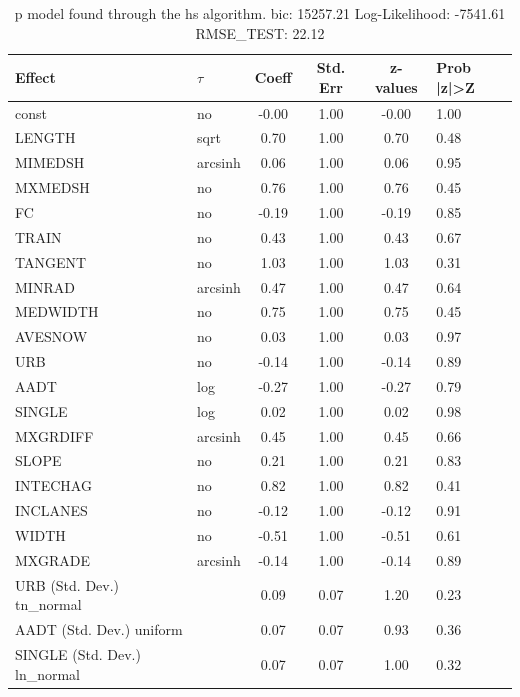 \begin{table}
	\caption{p model found through the hs algorithm. bic: 15257.21 Log-Likelihood: -7541.61 RMSE_TEST: 22.12}
	\begin{center}
		\begin{tabular}{|l|l|c|c|c|l|}
			\hline
			Effect & $\tau$ & Coeff & Std. Err & z-values & Prob |z|>Z \\
			\hline
			const & no & -0.00 & 1.00 & -0.00 & 1.00 \\
			\hline
			LENGTH & sqrt & 0.70 & 1.00 & 0.70 & 0.48 \\
			\hline
			MIMEDSH & arcsinh & 0.06 & 1.00 & 0.06 & 0.95 \\
			\hline
			MXMEDSH & no & 0.76 & 1.00 & 0.76 & 0.45 \\
			\hline
			FC & no & -0.19 & 1.00 & -0.19 & 0.85 \\
			\hline
			TRAIN & no & 0.43 & 1.00 & 0.43 & 0.67 \\
			\hline
			TANGENT & no & 1.03 & 1.00 & 1.03 & 0.31 \\
			\hline
			MINRAD & arcsinh & 0.47 & 1.00 & 0.47 & 0.64 \\
			\hline
			MEDWIDTH & no & 0.75 & 1.00 & 0.75 & 0.45 \\
			\hline
			AVESNOW & no & 0.03 & 1.00 & 0.03 & 0.97 \\
			\hline
			URB & no & -0.14 & 1.00 & -0.14 & 0.89 \\
			\hline
			AADT & log & -0.27 & 1.00 & -0.27 & 0.79 \\
			\hline
			SINGLE & log & 0.02 & 1.00 & 0.02 & 0.98 \\
			\hline
			MXGRDIFF & arcsinh & 0.45 & 1.00 & 0.45 & 0.66 \\
			\hline
			SLOPE & no & 0.21 & 1.00 & 0.21 & 0.83 \\
			\hline
			INTECHAG & no & 0.82 & 1.00 & 0.82 & 0.41 \\
			\hline
			INCLANES & no & -0.12 & 1.00 & -0.12 & 0.91 \\
			\hline
			WIDTH & no & -0.51 & 1.00 & -0.51 & 0.61 \\
			\hline
			MXGRADE & arcsinh & -0.14 & 1.00 & -0.14 & 0.89 \\
			\hline
			URB (Std. Dev.) tn_normal &  & 0.09 & 0.07 & 1.20 & 0.23 \\
			\hline
			AADT (Std. Dev.) uniform &  & 0.07 & 0.07 & 0.93 & 0.36 \\
			\hline
			SINGLE (Std. Dev.) ln_normal &  & 0.07 & 0.07 & 1.00 & 0.32 \\

\end{tabular}
\end{center}
\end{table}
